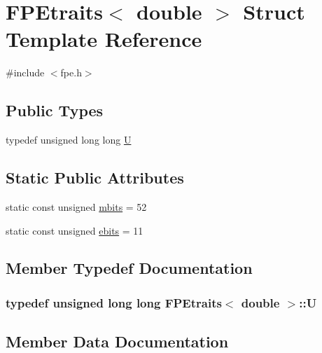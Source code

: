 \hypertarget{struct_f_p_etraits_3_01double_01_4}{}\section{F\+P\+Etraits$<$ double $>$ Struct Template Reference}
\label{struct_f_p_etraits_3_01double_01_4}


{\ttfamily \#include $<$fpe.\+h$>$}

\subsection*{Public Types}
\begin{DoxyCompactItemize}
\item 
typedef unsigned long long \hyperlink{struct_f_p_etraits_3_01double_01_4_a4a9c9f2fa5515ff6dc1feec0519cc9e0}{U}
\end{DoxyCompactItemize}
\subsection*{Static Public Attributes}
\begin{DoxyCompactItemize}
\item 
static const unsigned \hyperlink{struct_f_p_etraits_3_01double_01_4_a2f453e5079ff96e2eda4afe95e24acaa}{mbits} = 52
\item 
static const unsigned \hyperlink{struct_f_p_etraits_3_01double_01_4_a468104543d41c130edc80a0d38b58866}{ebits} = 11
\end{DoxyCompactItemize}


\subsection{Member Typedef Documentation}
\hypertarget{struct_f_p_etraits_3_01double_01_4_a4a9c9f2fa5515ff6dc1feec0519cc9e0}{}
\subsubsection[{U}]{\setlength{\rightskip}{0pt plus 5cm}typedef unsigned long long {\bf F\+P\+Etraits}$<$ double $>$\+::{\bf U}}\label{struct_f_p_etraits_3_01double_01_4_a4a9c9f2fa5515ff6dc1feec0519cc9e0}


\subsection{Member Data Documentation}
\hypertarget{struct_f_p_etraits_3_01double_01_4_a468104543d41c130edc80a0d38b58866}{}
